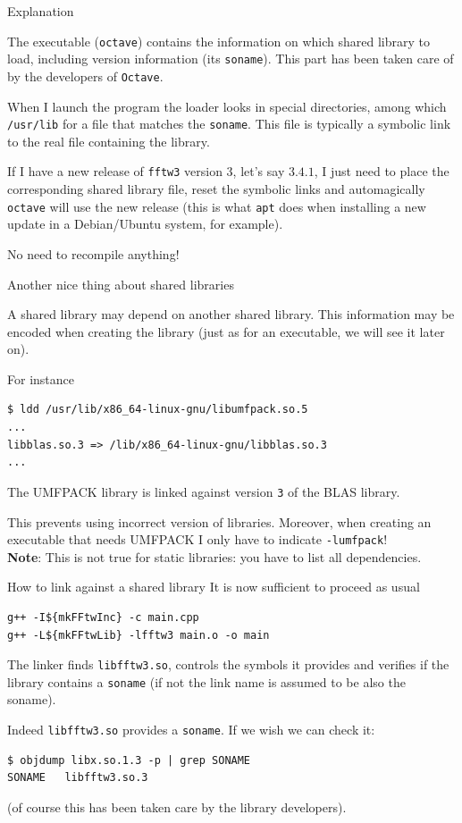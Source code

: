 \documentclass[10pt,aspectratio=169]{beamer}
\begin{document}
\begin{frame}{Explanation}  

  The executable (\texttt{octave}) contains the
  information on which shared library to load, including version
  information (its \texttt{soname}). This part has been taken care of by the 
  developers of \texttt{Octave}.
  \smallskip

  When I launch the program the loader looks in special directories,
  among which \texttt{/usr/lib} for a file that matches the
  \texttt{soname}. This file is typically a symbolic link to the real
  file containing the library.  
  \medskip

  If I have a new release of \texttt{fftw3} version 3, let's say $3.4.1$,
  I just need to place the corresponding shared library file, reset the symbolic links and automagically \texttt{octave}
  will use the new release (this is what \texttt{apt} does when
  installing a new update in a Debian/Ubuntu system, for example).

  \smallskip

  No need to recompile anything!
\end{frame}


\begin{frame}[fragile]{Another nice thing about shared libraries} 

  A shared library may depend on another shared library. This information may be encoded  when creating the library
  (just as for an executable, we will see it later on).

  For instance
\begin{verbatim}
$ ldd /usr/lib/x86_64-linux-gnu/libumfpack.so.5
...
libblas.so.3 => /lib/x86_64-linux-gnu/libblas.so.3
...
\end{verbatim}
The UMFPACK library is linked against version
\texttt{3} of the BLAS library. \smallskip

This prevents using incorrect version of
libraries. Moreover, when creating an executable that needs UMFPACK I only have to indicate
\texttt{-lumfpack}! \\
\textbf{Note}: This is not true for static libraries: you have to list all dependencies.
\end{frame}

\begin{frame}[fragile]{How to link against a shared library}   
  It is now sufficient to proceed as usual
\begin{verbatim}
g++ -I${mkFFtwInc} -c main.cpp
g++ -L${mkFFtwLib} -lfftw3 main.o -o main
\end{verbatim}

The linker finds \texttt{libfftw3.so}, controls the symbols it
provides and verifies if the library contains a
\texttt{soname} (if not the link name is assumed to be also the
soname).

Indeed \texttt{libfftw3.so} provides a \texttt{soname}. If we wish we
can check it:
\begin{verbatim}
$ objdump libx.so.1.3 -p | grep SONAME
SONAME   libfftw3.so.3
\end{verbatim}
(of course this has been taken care by the library developers).
\end{frame}
\end{document}
